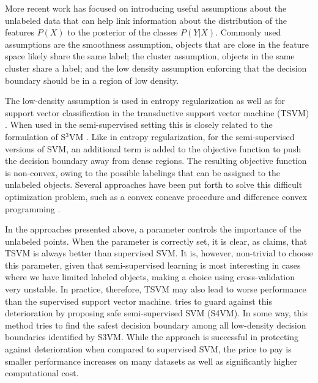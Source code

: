 \documentclass[smallcondensed]{svjour3}
\begin{document}
More recent work has focused on introducing useful assumptions about the unlabeled data that can help link information about the distribution of the features $P(X)$ to the posterior of the classes $P(Y|X)$. Commonly used assumptions are the smoothness assumption, objects that are close in the feature space likely share the same label; the cluster assumption, objects in the same cluster share a label; and the low density assumption enforcing that the decision boundary should be in a region of low density. 


The low-density assumption is used in entropy regularization \cite{Grandvalet2005} as well as for support vector classification in the transductive support vector machine (TSVM)  \cite{Joachims1999}. When used in the semi-supervised setting this is closely related to the formulation of S$^3$VM \cite{Bennett1998,Sindhwani2006}. Like in entropy regularization, for the semi-supervised versions of SVM, an additional term is added to the objective function to push the decision boundary away from dense regions. The resulting objective function is non-convex, owing to the possible labelings that can be assigned to the unlabeled objects. Several approaches have been put forth to solve this difficult optimization problem, such as a convex concave procedure \cite{Collobert2006} and difference convex programming \cite{Sindhwani2006,Wang2007}.

In the approaches presented above, a parameter controls the importance of the unlabeled points. When the parameter is correctly set, it is clear, as \cite{Wang2007a} claims, that TSVM is always better than supervised SVM. It is, however, non-trivial to choose this parameter, given that semi-supervised learning is most interesting in cases where we have limited labeled objects, making a choice using cross-validation very unstable. In practice, therefore, TSVM may also lead to worse performance than the supervised support vector machine. \cite{Li2011} tries to guard against this deterioration by proposing safe semi-supervised SVM (S4VM). In some way, this method tries to find the safest decision boundary among all low-density decision boundaries identified by S3VM. While the approach is successful in protecting against deterioration when compared to supervised SVM, the price to pay is smaller performance increases on many datasets as well as significantly higher computational cost.
\end{document}
